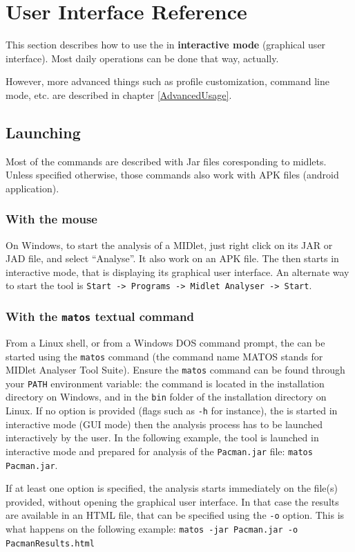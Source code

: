 \chapter{User Interface Reference}\label{BasicUsage}

This section describes how to use the \ma in \textbf{interactive mode}
(graphical user interface). Most daily operations can be done that
way, actually.

However, more advanced things such as profile customization, command line
mode, etc. are described in chapter \ref{AdvancedUsage}.

\section{Launching}
Most of the commands are described with Jar files coresponding to midlets.
Unless specified otherwise, those commands also work with APK files (android
application).

\subsection*{With the mouse} On Windows, to start the analysis of
a MIDlet, just right click on its JAR or JAD file, and select ``Analyse''. It also work on an APK file. The \ma then starts in interactive mode, that is displaying its graphical user interface. An alternate way to start
the tool is \texttt{Start -> Programs -> Midlet Analyser -> Start}.

\subsection*{With the \texttt{matos} textual command}
From a Linux shell, or from a Windows DOS command prompt, the \ma can be
started using the \texttt{matos} command (the command name MATOS
stands for MIDlet Analyser Tool Suite). Ensure the \texttt{matos}
command can be found through your \texttt{PATH} environment variable:
the command is located in the installation directory on Windows, and
in the \texttt{bin} folder of the installation directory on Linux. If
no option is provided (flags such as \texttt{-h} for instance), the
\ma is started in interactive mode (GUI mode) then the analysis
process has to be launched interactively by the user. In the following
example, the tool is launched in interactive mode and prepared for analysis of the
\texttt{Pacman.jar} file: \texttt{matos Pacman.jar}. 

If at least one option is specified, the analysis starts immediately on
the file(s) provided, without opening the graphical user
interface. In that case the results are available in an HTML file, that can be
specified using the \texttt{-o} option. This is what happens on the
following example: \texttt{matos -jar Pacman.jar -o PacmanResults.html}

